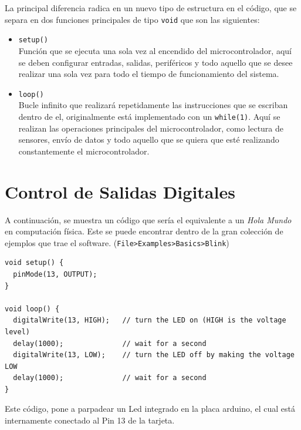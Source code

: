 \documentclass[letterpaper, 10pt]{report}
\begin{document}
La principal diferencia radica en un nuevo tipo de estructura en el código, que se separa en dos funciones principales de tipo \texttt{void} que son las siguientes:
\begin{itemize}
	\item \texttt{setup()}\\Función que se ejecuta una sola vez al encendido del microcontrolador, aquí se deben configurar entradas, salidas, periféricos y todo aquello que se desee realizar una sola vez para todo el tiempo de funcionamiento del sistema.
	
	\item \texttt{loop()}\\Bucle infinito que realizará repetidamente las instrucciones que se escriban dentro de el, originalmente está implementado con un \texttt{while(1)}. Aquí se realizan las operaciones principales del microcontrolador, como lectura de sensores, envío de datos y todo aquello que se quiera que esté realizando constantemente el microcontrolador.
\end{itemize}

\section{Control de Salidas Digitales}

A continuación, se muestra un código que sería el equivalente a un \emph{Hola Mundo} en computación física. Este se puede encontrar dentro de la gran colección de ejemplos que trae el software. (\texttt{File>Examples>Basics>Blink})
\\
\begin{lstlisting}[style=myArduino]
void setup() {  
  pinMode(13, OUTPUT);
}

void loop() {
  digitalWrite(13, HIGH);   // turn the LED on (HIGH is the voltage level)
  delay(1000);              // wait for a second
  digitalWrite(13, LOW);    // turn the LED off by making the voltage LOW
  delay(1000);              // wait for a second
}
\end{lstlisting}

Este código, pone a parpadear un Led integrado en la placa arduino, el cual está internamente conectado al Pin 13 de la tarjeta.
\end{document}
